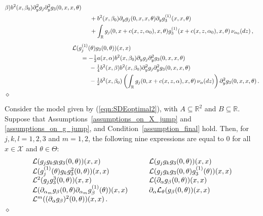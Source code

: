 \documentclass[11pt,a4paper]{article}
\newcommand{\alphan}{{\alpha_0}}
\newcommand{\betan}{{\beta_0}}
\newcommand{\RR}{{\mathbb R}}
\renewcommand{\ll}{{\mathcal{L}}}
\newcommand{\xx}{{\mathcal{X}}}
\newcommand{\dqed}{{\leavevmode \unskip \penalty9999 \hbox{} \nobreak \hfill \quad \hbox{$\diamond$}}}
\numberwithin{equation}{section}
\numberwithin{theorem}{section}
\begin{document}
\begin{lemma}
\begin{align*}
\begin{split}
  \beta) b^2(x,
\betan) \partial^2_y g_{j} \partial^2_y g_{3}(0,x,x, \theta)\\
&\hspace{5mm} +b^2(x,
\betan) \partial_y g_{j}(0,x,x, \theta)\partial_y
  g_{3}^{(1)}(x,x, \theta)\\
&\hspace{5mm}+ \int_\RR g_{j}(0,x+c(x,z,\alphan),x, \theta)
  g_{3}^{(1)}(x+c(x,z,\alphan), x, \theta) \,\nu_\alphan(dz)\,,
\end{split}\\[0.5em]
  \begin{split}
&\hspace{-5mm} \ll ( g_{j}^{(1)}(\theta)g_{3}(0,\theta) )(x,x) \\
&= -\tfrac{1}{2} a(x, \alpha)b^2(x,
\betan) \partial_y g_{j}\partial^2_y g_{3}(0,x,x, \theta) \\
&\hspace{5mm}-\tfrac{1}{4} b^2(x, \beta) b^2(x,
\betan) \partial^2_yg_{j}\partial^2_y g_{3}(0,x,x, \theta) \\
&\hspace{5mm} -\tfrac{1}{2} b^2(x,
\betan) \left(\int_\RR g_{j}(0,x+c(x,z,\alpha),x, \theta)\, \nu_\alpha(dz)\right) \partial^2_y g_{3}(0,x,x,
\theta)\,.
\end{split}
  \end{align*}
\dqed
\label{lemma:generators_rate}
\end{lemma}
%
\begin{lemma} 
Consider the model given by (\ref{eqn:SDEoptimal2}), with
  $A\subseteq \RR^2$ and $B\subseteq \RR$. Suppose that Assumptions~\ref{assumptions_on_X_jump} and
\ref{assumptions_on_g_jump}, and
Condition~\ref{assumption_final} hold. Then, for $j,k,l
= 1,2,3$ and $m=1,2$, the following nine expressions are equal to $0$ for all $x\in
\xx$ and $\theta \in \Theta$: 
\begin{displaymath}
\begin{array}{lll}
\ll ( g_{j}g_{k}g_{l}g_{3}(0,
  \theta))(x,x) & \hspace{7mm} \ll( g_{j}g_{k}g_{3}(0,
  \theta))(x,x) \\\ll(
  g_{j}^{(1)}(\theta) g_{k}g_{3}^2(0,\theta))(x,x) & \hspace{7mm} \ll ( g_{j}g_{k}g_{3}(0,\theta)g_{3}^{(1)}(\theta))(x,x)  \\ 
\ll^2(g_{j}g_3^3(0,\theta))(x,x)  & \hspace{7mm}
\ll( \partial_\alpha g_\beta(0, \theta))(x,x) \\
\ll( \partial_{\alpha_m} g_\beta(0, \theta)\partial_{\alpha_m}
  g_\beta^{(1)}(\theta))(x,x)  &  \hspace{7mm} 
\partial_\alpha \ll_\theta( g_\beta(0,\theta))(x,x)  \\ 
\ll^m( (\partial_\alpha g_\beta)^2(0, \theta))(x,x) \,.  & 
\end{array}
\end{displaymath}
\dqed
\label{lemma:generator3_rate}
\end{lemma}
\end{document}

